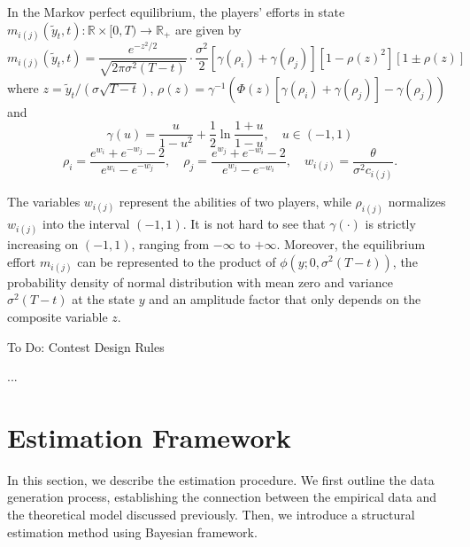 \documentclass[mnsc]{informs3}
\begin{document}
\begin{lemma}
In the Markov perfect equilibrium, the players’ efforts in state $m_{i(j)}(\tilde{y}_t, t) :\mathbb{R}\times[0, T)\to\mathbb{R}_+$ are given by
\begin{equation}\label{eq-equilibrium-effort}
m_{i(j)}(\tilde{y}_t, t) = \frac{e^{-z^2/2}}{\sqrt{2\pi\sigma^2(T-t)}}\cdot \frac{\sigma^2}{2}\left[\gamma(\rho_{i}) + \gamma(\rho_{j})\right]\left[1-\rho(z)^2\right]\left[1 \pm \rho(z)\right]
\end{equation}
where $z = \tilde{y}_t / (\sigma\sqrt{T-t})$, $\rho(z) = \gamma^{-1}\left(\Phi(z)\left[\gamma(\rho_{i})+\gamma(\rho_{j})\right]-\gamma(\rho_{j})\right)$ and 
\begin{equation*}
\gamma(u) = \frac{u}{1-u^2} + \frac{1}{2}\ln\frac{1+u}{1-u},\quad u\in(-1,1)
\end{equation*}
\begin{equation*}
\rho_{i} = \frac{e^{w_{i}}+e^{-w_{j}}-2}{e^{w_{i}}-e^{-w_{j}}},
\quad
\rho_{j} = \frac{e^{w_{j}}+e^{-w_{i}}-2}{e^{w_{j}}-e^{-w_{i}}},
\quad
w_{i(j)} = \frac{\theta}{\sigma^2 c_{i(j)}}.
\end{equation*}
\end{lemma}

The variables $w_{i(j)}$ represent the abilities of two players, while $\rho_{i(j)}$ normalizes $w_{i(j)}$ into the interval $(-1, 1)$. 
It is not hard to see that $\gamma(\cdot)$ is strictly increasing on $(-1,1)$, ranging from $-\infty$ to $+\infty$. 
Moreover, the equilibrium effort $m_{i(j)}$ can be represented to the product of $\phi(y; 0, \sigma^2(T-t))$, the probability density of normal distribution with mean zero and variance $\sigma^2(T-t)$ at the state $y$ and an amplitude factor that only depends on the composite variable $z$. 

To Do: Contest Design Rules

\begin{proposition}
...
\end{proposition}




\section{Estimation Framework}

In this section, we describe the estimation procedure. 
We first outline the data generation process, establishing the connection between the empirical data and the theoretical model discussed previously.
Then, we introduce a structural estimation method using Bayesian framework.
\end{document}
